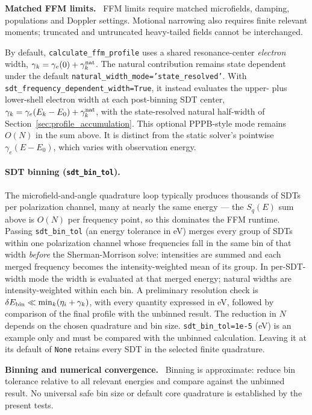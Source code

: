 \documentclass[11pt,a4paper]{article}
\newenvironment{caveat}[1][Caveat]{%
  \par\smallskip\noindent\begin{lrbox}{\notebox}\setlength{\fboxsep}{6pt}\begin{minipage}{\dimexpr\linewidth-2\fboxsep-2\fboxrule\relax}\small\textbf{#1.}\ }{%
  \end{minipage}\end{lrbox}\setlength{\fboxsep}{6pt}\fcolorbox{warnframe}{warnbg}{\usebox{\notebox}}\par\smallskip}
\numberwithin{equation}{section}
\begin{document}
\begin{caveat}[Matched FFM limits]
FFM limits require matched microfields, damping, populations and Doppler settings.
Motional narrowing also requires finite relevant moments; truncated and untruncated
heavy-tailed fields cannot be interchanged.
\end{caveat}

By default, \texttt{calculate\_ffm\_profile} uses a shared resonance-center
\emph{electron} width, $\gamma_k=\gamma_e(0)+\gamma^{\rm nat}_k$.
The natural contribution remains state dependent under the default
\texttt{natural\_width\_mode=}\allowbreak\texttt{'state\_resolved'}. With
\texttt{sdt\_frequency\_dependent\_width=True}, it instead evaluates the upper-
plus lower-shell electron width at each post-binning SDT center,
$\gamma_k=\gamma_e(E_k-E_0)+\gamma^{\rm nat}_k$, with the state-resolved natural half-width of Section~\ref{sec:profile_accumulation}. This optional
PPPB-style mode remains $O(N)$ in the sum above. It is distinct from the static
solver's pointwise $\gamma_e(E-E_0)$, which varies with observation energy.

\paragraph{SDT binning (\texttt{sdt\_bin\_tol}).}
The microfield-and-angle quadrature loop typically produces thousands of SDTs per
polarization channel, many at nearly the same energy — the $S_q(E)$ sum above is
$O(N)$ per frequency point, so this dominates the FFM runtime.  Passing
\texttt{sdt\_bin\_tol} (an energy tolerance in eV) merges every group of SDTs within one
polarization channel whose frequencies fall in the same bin of that width \emph{before}
the Sherman-Morrison solve: intensities are summed and each merged frequency becomes the
intensity-weighted mean of its group. In per-SDT-width mode the width is evaluated
at that merged energy; natural widths are intensity-weighted within each bin.
A preliminary resolution check is $\delta E_{\rm bin}\ll\min_k(\eta_i+\gamma_k)$,
with every quantity expressed in eV, followed by comparison of the final
profile with the unbinned result. The reduction in $N$ depends on the chosen
quadrature and bin size. \texttt{sdt\_bin\_tol=1e-5} (eV) is an
example only and must be compared with the unbinned calculation.  Leaving it at its default of
\texttt{None} retains every SDT in the selected finite quadrature.

\begin{caveat}[Binning and numerical convergence]
Binning is approximate: reduce bin
tolerance relative to all relevant energies and compare against the unbinned result.
No universal safe bin size or default core quadrature
is established by the present tests.
\end{caveat}
\end{document}
